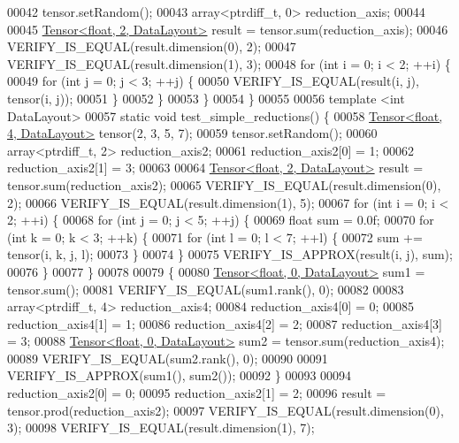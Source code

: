 \begin{DoxyCode}
00042     tensor.setRandom();
00043     array<ptrdiff\_t, 0> reduction\_axis;
00044 
00045     \hyperlink{class_eigen_1_1_tensor}{Tensor<float, 2, DataLayout>} result = tensor.sum(reduction\_axis);
00046     VERIFY\_IS\_EQUAL(result.dimension(0), 2);
00047     VERIFY\_IS\_EQUAL(result.dimension(1), 3);
00048     \textcolor{keywordflow}{for} (\textcolor{keywordtype}{int} i = 0; i < 2; ++i) \{
00049       \textcolor{keywordflow}{for} (\textcolor{keywordtype}{int} j = 0; j < 3; ++j) \{
00050         VERIFY\_IS\_EQUAL(result(i, j), tensor(i, j));
00051       \}
00052     \}
00053   \}
00054 \}
00055 
00056 \textcolor{keyword}{template} <\textcolor{keywordtype}{int} DataLayout>
00057 \textcolor{keyword}{static} \textcolor{keywordtype}{void} test\_simple\_reductions() \{
00058   \hyperlink{class_eigen_1_1_tensor}{Tensor<float, 4, DataLayout>} tensor(2, 3, 5, 7);
00059   tensor.setRandom();
00060   array<ptrdiff\_t, 2> reduction\_axis2;
00061   reduction\_axis2[0] = 1;
00062   reduction\_axis2[1] = 3;
00063 
00064   \hyperlink{class_eigen_1_1_tensor}{Tensor<float, 2, DataLayout>} result = tensor.sum(reduction\_axis2);
00065   VERIFY\_IS\_EQUAL(result.dimension(0), 2);
00066   VERIFY\_IS\_EQUAL(result.dimension(1), 5);
00067   \textcolor{keywordflow}{for} (\textcolor{keywordtype}{int} i = 0; i < 2; ++i) \{
00068     \textcolor{keywordflow}{for} (\textcolor{keywordtype}{int} j = 0; j < 5; ++j) \{
00069       \textcolor{keywordtype}{float} sum = 0.0f;
00070       \textcolor{keywordflow}{for} (\textcolor{keywordtype}{int} k = 0; k < 3; ++k) \{
00071         \textcolor{keywordflow}{for} (\textcolor{keywordtype}{int} l = 0; l < 7; ++l) \{
00072           sum += tensor(i, k, j, l);
00073         \}
00074       \}
00075       VERIFY\_IS\_APPROX(result(i, j), sum);
00076     \}
00077   \}
00078 
00079   \{
00080     \hyperlink{class_eigen_1_1_tensor}{Tensor<float, 0, DataLayout>} sum1 = tensor.sum();
00081     VERIFY\_IS\_EQUAL(sum1.rank(), 0);
00082 
00083     array<ptrdiff\_t, 4> reduction\_axis4;
00084     reduction\_axis4[0] = 0;
00085     reduction\_axis4[1] = 1;
00086     reduction\_axis4[2] = 2;
00087     reduction\_axis4[3] = 3;
00088     \hyperlink{class_eigen_1_1_tensor}{Tensor<float, 0, DataLayout>} sum2 = tensor.sum(reduction\_axis4);
00089     VERIFY\_IS\_EQUAL(sum2.rank(), 0);
00090 
00091     VERIFY\_IS\_APPROX(sum1(), sum2());
00092   \}
00093 
00094   reduction\_axis2[0] = 0;
00095   reduction\_axis2[1] = 2;
00096   result = tensor.prod(reduction\_axis2);
00097   VERIFY\_IS\_EQUAL(result.dimension(0), 3);
00098   VERIFY\_IS\_EQUAL(result.dimension(1), 7);

\end{DoxyCode}

